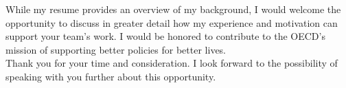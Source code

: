 \documentclass[11pt,a4paper,roman]{moderncv}
\begin{document}
\vspace{1em}
While my resume provides an overview of my background, I would welcome the opportunity to discuss in greater detail how my experience and motivation can support your team's work. I would be honored to contribute to the OECD's mission of supporting better policies for better lives.\\

\vspace{1em}
Thank you for your time and consideration. I look forward to the possibility of speaking with you further about this opportunity.

\vspace{0.5cm}


\makeletterclosing
\end{document}

